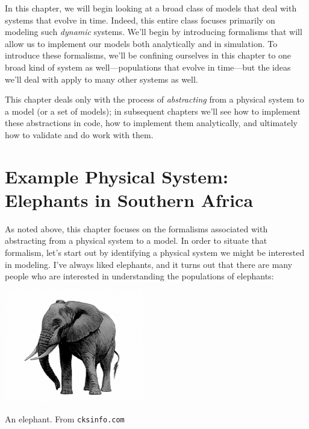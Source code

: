 In this chapter, we will begin looking at a broad class of models that deal with systems that evolve in time.  Indeed, this entire class focuses primarily on modeling such {\it dynamic} systems.   We'll begin by introducing formalisms that will allow us to implement our models both analytically and in simulation.  To introduce these formalisms, we'll be confining ourselves in this chapter to one broad kind of system as well---populations that evolve in time---but the ideas we'll deal with apply to many other systems as well.

This chapter deals only with the process of {\it abstracting} from a physical system to a model (or a set of models); in subsequent chapters we'll see how to implement these abstractions in code, how to implement them analytically, and ultimately how to validate and do work with them.  

\section{Example Physical System: Elephants in Southern Africa}

As noted above, this chapter focuses on the formalisms associated with abstracting from a physical system to a model.  In order to situate that formalism, let's start out by identifying a physical system we might be interested in modeling.  I've always liked elephants, and it turns out that there are many people who are interested in understanding the populations of elephants:

\begin{marginfigure}
\includegraphics[width=6cm]{figs/elephant}
\caption{An elephant.  From {\tt cksinfo.com}}
\end{marginfigure}


